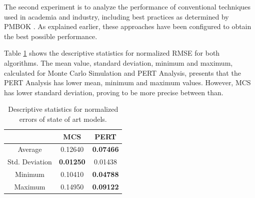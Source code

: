 The second experiment is to analyze the performance of conventional techniques used in academia and industry, including best practices as determined by PMBOK \cite{PMBOK2008}. As explained earlier, these approaches have been configured to obtain the best possible performance.

Table \ref{tab:arte_descriptive} shows the descriptive statistics for normalized RMSE for both algorithms. The mean value, standard deviation, minimum and maximum, calculated for Monte Carlo Simulation and PERT Analysis, presents that the PERT Analysis has lower mean, minimum and maximum values. However, MCS has lower standard deviation, proving to be more precise between than.

\begin{table}[h]
\caption{Descriptive statistics for normalized errors of state of art models.}\label{tab:arte_descriptive} \centering
\begin{tabular}{|c|c|c|}
  \hline
   & MCS & PERT \\
  \hline
  Average & 0.12640 & \textbf{0.07466}   \\
  \hline
  Std. Deviation & \textbf{0.01250} & 0.01438   \\
  \hline
  Minimum & 0.10410 & \textbf{0.04788}   \\
  \hline
  Maximum & 0.14950 & \textbf{0.09122}   \\
  \hline
\end{tabular}
\end{table}

